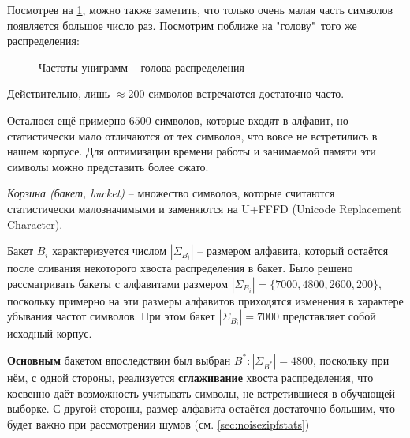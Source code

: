 Посмотрев на \cref{plt:gramstats1_head}, можно также заметить, что только очень малая часть символов появляется большое число раз. Посмотрим поближе на "голову"\ того же распределения:

\begin{figure}[H]
	\caption{Частоты униграмм -- голова распределения }
	\label{plt:gramstats1_head}
\end{figure}
Действительно, лишь $\approx 200$ символов встречаются достаточно часто.

Осталюся ещё примерно $6500$ символов, которые входят в алфавит, но статистически мало отличаются от тех символов, что вовсе не встретились в нашем корпусе. Для оптимизации времени работы и занимаемой памяти эти символы можно представить более сжато.

\begin{definition}
	{\textit{Корзина (бакет, bucket)}} -- множество символов, которые считаются статистически малозначимыми и заменяются на U+FFFD (Unicode Replacement Character).
\end{definition}

Бакет $B_i$ характеризуется числом $|\Sigma_{B_i}|$ -- размером алфавита, который остаётся после сливания некоторого хвоста распределения в бакет. Было решено рассматривать бакеты с алфавитами размером $|\Sigma_{B_i}| = \{ 7000, 4800, 2600, 200 \}$, поскольку примерно на эти размеры алфавитов приходятся изменения в характере убывания частот символов. При этом бакет $|\Sigma_{B_i}| = 7000$ представляет собой исходный корпус. 

\textbf{Основным} бакетом впоследствии был выбран $B^* : |\Sigma_{B^*}| = 4800$, поскольку при нём, с одной стороны, реализуется \textbf{сглаживание} хвоста распределения, что косвенно даёт возможность учитывать символы, не встретившиеся в обучающей выборке. С другой стороны, размер алфавита остаётся достаточно большим, что будет важно при рассмотрении шумов (см. \cref{sec:noisezipfstats})

